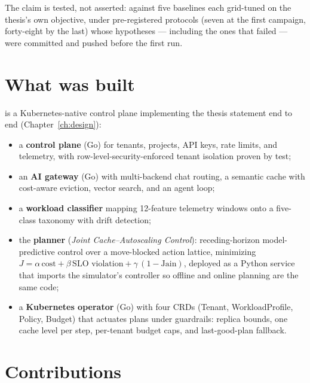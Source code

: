 The claim is tested, not asserted: against five baselines each grid-tuned on
the thesis's own objective, under pre-registered protocols (seven at the
first campaign, forty-eight by the last) whose hypotheses --- including the
ones that failed --- were committed and pushed before the first run.

\section{What was built}

\polyforge{} is a Kubernetes-native control plane implementing the thesis
statement end to end (Chapter~\ref{ch:design}):

\begin{itemize}
  \item a \textbf{control plane} (Go) for tenants, projects, API keys, rate
        limits, and telemetry, with row-level-security-enforced tenant
        isolation proven by test;
  \item an \textbf{AI gateway} (Go) with multi-backend chat routing, a
        semantic cache with cost-aware eviction, vector search, and an agent
        loop;
  \item a \textbf{workload classifier} mapping 12-feature telemetry windows
        onto a five-class taxonomy with drift detection;
  \item the \textbf{\jcac{} planner} (\emph{Joint Cache--Autoscaling
        Control}): receding-horizon model-predictive control over a
        move-blocked action lattice, minimizing
        $J = \alpha\,\text{cost} + \beta\,\text{SLO violation} +
        \gamma\,(1-\text{Jain})$, deployed as a Python service that imports
        the simulator's controller so offline and online planning are the
        same code;
  \item a \textbf{Kubernetes operator} (Go) with four CRDs (Tenant,
        WorkloadProfile, Policy, Budget) that actuates plans under
        guardrails: replica bounds, one cache level per step, per-tenant
        budget caps, and last-good-plan fallback.
\end{itemize}

\section{Contributions}


